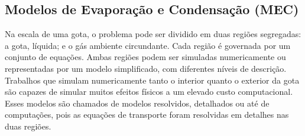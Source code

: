 


\subsection{Modelos de Evaporação e Condensação (MEC)} \label{sec:MEC}


Na escala de uma gota, o problema pode ser dividido em duas regiões segregadas: a gota, líquida; e o gás ambiente circundante. 
Cada região é governada por um conjunto de equações.
Ambas regiões podem ser simuladas numericamente ou representadas por um modelo simplificado, com diferentes níveis de descrição.
Trabalhos que simulam numericamente tanto o interior quanto o exterior da gota são capazes de simular muitos efeitos físicos a um elevado custo computacional.
Esses modelos são chamados de modelos resolvidos, detalhados ou até de computações, pois as equações de transporte foram resolvidas em detalhes nas duas regiões.

